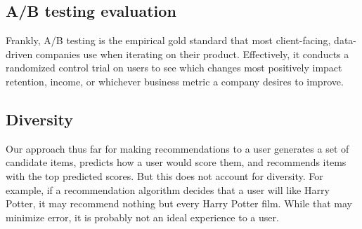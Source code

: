 \documentclass[titlepage, 12pt, leqno]{article}
\begin{document}
\subsection{A/B testing evaluation}
Frankly, A/B testing is the empirical gold standard that most client-facing,
data-driven companies use when iterating on their product. Effectively, it
conducts a randomized control trial on users to see which changes most positively
impact retention, income, or whichever business metric a company desires to
improve.

\subsection{Diversity}
Our approach thus far for making recommendations to a user generates a set of
candidate items, predicts how a user would score them, and recommends items with
the top predicted scores. But this does not account for diversity. For example,
if a recommendation algorithm decides that a user will like Harry Potter, it may
recommend nothing but every Harry Potter film. While that may minimize error,
it is probably not an ideal experience to a user.
\end{document}
